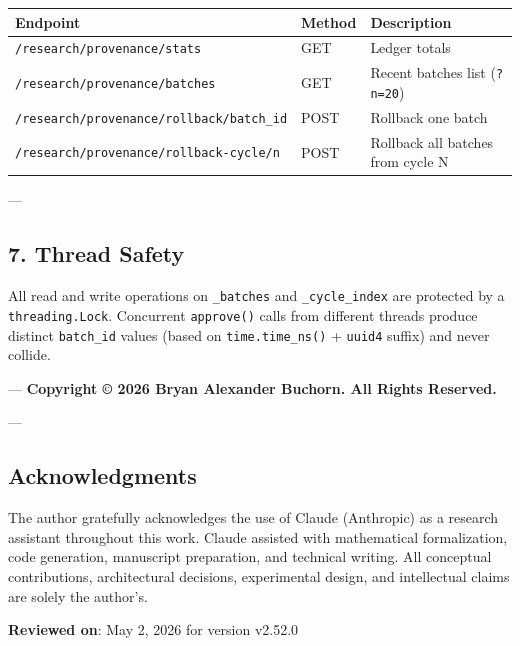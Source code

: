 \begin{center}
{\footnotesize
\begin{tabularx}{\columnwidth}{|>{\raggedright\arraybackslash}X|>{\raggedright\arraybackslash}X|>{\raggedright\arraybackslash}X|}
\hline
Endpoint & Method & Description \\ \hline
\texttt{/research/provenance/stats} & GET & Ledger totals \\ \hline
\texttt{/research/provenance/batches} & GET & Recent batches list (\texttt{?n=20}) \\ \hline
\texttt{/research/provenance/rollback/{batch\_id}} & POST & Rollback one batch \\ \hline
\texttt{/research/provenance/rollback-cycle/{n}} & POST & Rollback all batches from cycle N \\ \hline
\end{tabularx}
}
\end{center}

---

\subsection{7. Thread Safety}

All read and write operations on \texttt{\_batches} and \texttt{\_cycle\_index} are protected by a \texttt{threading.Lock}. Concurrent \texttt{approve()} calls from different threads produce distinct \texttt{batch\_id} values (based on \texttt{time.time\_ns()} + \texttt{uuid4} suffix) and never collide.

---
\textbf{Copyright © 2026 Bryan Alexander Buchorn. All Rights Reserved.}

---
\subsection{Acknow\-ledgments}

The author gratefully ackno\-wledges the use of Claude (Anthropic) as a research assistant throughout this work. Claude assisted with mathe\-matical forma\-lization, code generation, manuscript preparation, and technical writing. All conceptual contr\-ibutions, archi\-tectural decisions, exper\-imental design, and intel\-lectual claims are solely the author's.

\textbf{Reviewed on}: May 2, 2026 for version v2.52.0
